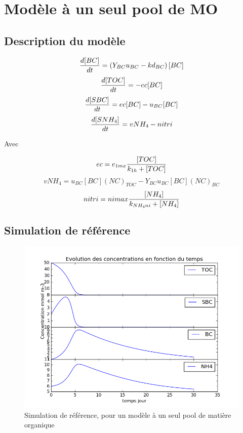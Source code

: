 \section{Mod\`ele \`a un seul pool de MO}
\subsection{Description du mod\`ele}

\begin{equation}
  {{d[BC]}\over{dt}} =
  \left ( Y_{BC} u_{BC} - kd_{BC} \right ) [BC]
  \label{eq:eq1}
\end{equation}
\begin{equation}
  {{d[TOC]}\over{dt}} =
  -ec [BC]
  \label{eq:eq2}
\end{equation}
\begin{equation}
  {{d[SBC]}\over{dt}} =
  ec [BC] - u_{BC} [BC]
  \label{eq:eq3}
\end{equation}
\begin{equation}
  {{d[SNH_4]}\over{dt}} =
  vNH_4 - nitri
  \label{eq:eq4}
\end{equation}

\par{
Avec
}

\begin{equation}
  ec = e_{1mx} {{[TOC]}\over{k_{1h} + [TOC]}}
  \label{eq:eq5}
\end{equation}
\begin{equation}
  vNH_4 = u_{BC} [BC] (NC)_{TOC} - Y_{BC} u_{BC} [BC] (NC)_{BC}
  \label{eq:eq6}
\end{equation}
\begin{equation}
  nitri = nimax {{[NH_4]}\over{k_{NH_4ni}+[NH_4]}}
  \label{eq:eq7}
\end{equation}

\subsection{Simulation de r\'ef\'erence}

\begin{figure}[h!]
  \includegraphics[width=\textwidth]{partie1/Ref.png}
  \caption{Simulation de r\'ef\'erence, pour un mod\`ele \`a un seul pool de mati\`ere organique
  }
  \label{fig:partie1ref}
\end{figure}


